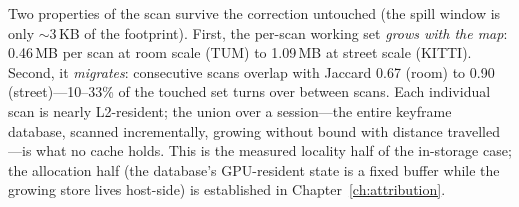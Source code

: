 Two properties of the scan survive the correction untouched (the spill
window is only $\sim$3\,KB of the footprint). First, the per-scan working
set \emph{grows with the map}: 0.46\,MB per scan at room scale (TUM) to
1.09\,MB at street scale (KITTI). Second, it \emph{migrates}: consecutive
scans overlap with Jaccard 0.67 (room) to 0.90 (street)---10--33\% of the
touched set turns over between scans. Each individual scan is nearly
L2-resident; the union over a session---the entire keyframe database,
scanned incrementally, growing without bound with distance travelled---is
what no cache holds. This is the measured locality half of the in-storage
case; the allocation half (the database's GPU-resident state is a fixed
buffer while the growing store lives host-side) is established in
Chapter~\ref{ch:attribution}.

